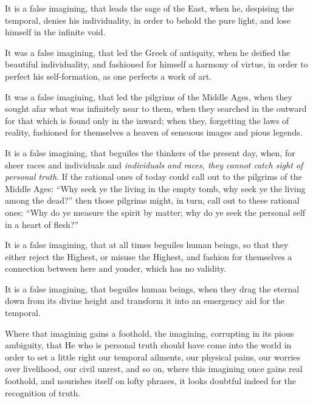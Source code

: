 \documentclass[12pt,a4paper]{book}
\begin{document}
It is a false imagining, that leads the sage of the East, when he, despising the temporal, denies his individuality, in order to behold the pure light, and lose himself in the infinite void.

It was a false imagining, that led the Greek of antiquity, when he deified the beautiful individuality, and fashioned for himself a harmony of virtue, in order to perfect his self-formation, as one perfects a work of art.

It was a false imagining, that led the pilgrims of the Middle Ages, when they sought afar what was infinitely near to them, when they searched in the outward for that which is found only in the inward; when they, forgetting the laws of reality, fashioned for themselves a heaven of sensuous images and pious legends.

It is a false imagining, that beguiles the thinkers of the present day, when, for sheer races and individuals and \emph{individuals and races, they cannot catch sight of personal truth}.
If the rational ones of today could call out to the pilgrims of the Middle Ages: ``Why seek ye the living in the empty tomb, why seek ye the living among the dead?'' then those pilgrims might, in turn, call out to these rational ones: ``Why do ye measure the spirit by matter; why do ye seek the personal self in a heart of flesh?''

It is a false imagining, that at all times beguiles human beings, so that they either reject the Highest, or misuse the Highest, and fashion for themselves a connection between here and yonder, which has no validity.

It is a false imagining, that beguiles human beings, when they drag the eternal down from its divine height and transform it into an emergency aid for the temporal.

Where that imagining gains a foothold, the imagining, corrupting in its pious ambiguity, that He who is personal truth should have come into the world in order to set a little right our temporal ailments, our physical pains, our worries over livelihood, our civil unrest, and so on, where this imagining once gains real foothold, and nourishes itself on lofty phrases, it looks doubtful indeed for the recognition of truth.
\end{document}
